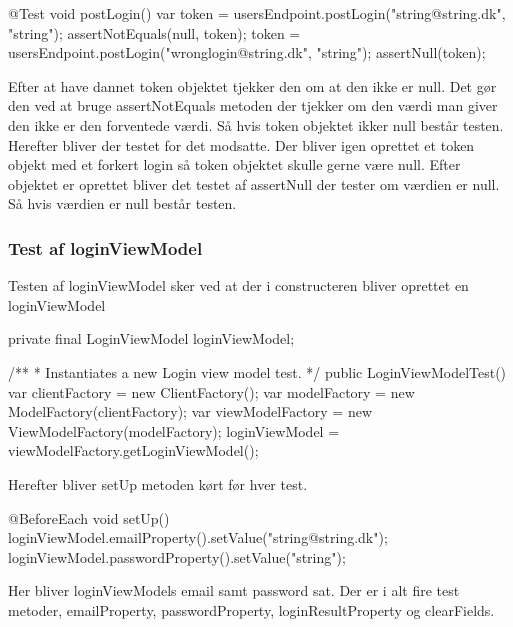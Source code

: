 \begin{code}[caption=UsersEndpointTest.jar, firstnumber=34]
@Test
void postLogin() {
    var token = usersEndpoint.postLogin("string@string.dk", "string");
    assertNotEquals(null, token);
    token = usersEndpoint.postLogin("wronglogin@string.dk", "string");
    assertNull(token);
}
\end{code}    

Efter at have dannet token objektet tjekker den om at den ikke er null. Det gør den ved at bruge assertNotEquals metoden der tjekker om den værdi man giver den ikke er den forventede værdi. Så hvis token objektet ikker null består testen. \\

Herefter bliver der testet for det modsatte. Der bliver igen oprettet et token objekt med et forkert login så token objektet skulle gerne være null. Efter objektet er oprettet bliver det testet af assertNull der tester om værdien er null. Så hvis værdien er null består testen. \\

\subsubsection{Test af loginViewModel}
Testen af loginViewModel sker ved at der i constructeren bliver oprettet en loginViewModel\\
\begin{code}[caption=LoginViewModel.jar, firstnumber=16]
private final LoginViewModel loginViewModel;

/**
 * Instantiates a new Login view model test.
 */
public LoginViewModelTest() {
    var clientFactory = new ClientFactory();
    var modelFactory = new ModelFactory(clientFactory);
    var viewModelFactory = new ViewModelFactory(modelFactory);
    loginViewModel = viewModelFactory.getLoginViewModel();
}
\end{code}

Herefter bliver setUp metoden kørt før hver test.\\

\begin{code}[caption=LoginViewModel.jar, firstnumber=28]
@BeforeEach
void setUp() {
    loginViewModel.emailProperty().setValue("string@string.dk");
    loginViewModel.passwordProperty().setValue("string");
}
\end{code}

Her bliver loginViewModels email samt password sat.
Der er i alt fire test metoder, emailProperty, passwordProperty, loginResultProperty og clearFields.\\
    
